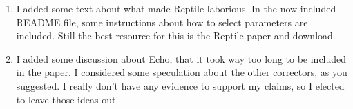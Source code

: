 \documentclass[11pt]{article}
\begin{document}
\begin{enumerate}
\begin{addmargin}[2em]{2em}
I am happy to make them part of the main document, but I figured that 7 figures for a short MS is too much, and these are important only in that they characterize the simulated datasets, but do speak to findings.
\end{addmargin}

\item I added some text about what made Reptile laborious. In the now included README file, some instructions about how to select parameters are included. Still the best resource for this is the Reptile paper and download.

\item I added some discussion about Echo, that it took way too long to be included in the paper. I considered some speculation about the other correctors, as you suggested. I really don't have any evidence to support my claims, so I elected to leave those ideas out. 

\end{enumerate}
\end{document}
